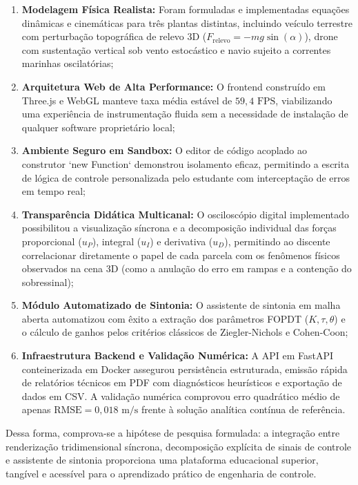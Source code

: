 \begin{enumerate}
    \item \textbf{Modelagem Física Realista:} Foram formuladas e implementadas equações dinâmicas e cinemáticas para três plantas distintas, incluindo veículo terrestre com perturbação topográfica de relevo 3D ($F_{\text{relevo}} = -mg\sin(\alpha)$), drone com sustentação vertical sob vento estocástico e navio sujeito a correntes marinhas oscilatórias;
    \item \textbf{Arquitetura Web de Alta Performance:} O frontend construído em Three.js e WebGL manteve taxa média estável de $59{,}4\text{ FPS}$, viabilizando uma experiência de instrumentação fluida sem a necessidade de instalação de qualquer software proprietário local;
    \item \textbf{Ambiente Seguro em Sandbox:} O editor de código acoplado ao construtor `new Function` demonstrou isolamento eficaz, permitindo a escrita de lógica de controle personalizada pelo estudante com interceptação de erros em tempo real;
    \item \textbf{Transparência Didática Multicanal:} O osciloscópio digital implementado possibilitou a visualização síncrona e a decomposição individual das forças proporcional ($u_P$), integral ($u_I$) e derivativa ($u_D$), permitindo ao discente correlacionar diretamente o papel de cada parcela com os fenômenos físicos observados na cena 3D (como a anulação do erro em rampas e a contenção do sobressinal);
    \item \textbf{Módulo Automatizado de Sintonia:} O assistente de sintonia em malha aberta automatizou com êxito a extração dos parâmetros FOPDT ($K, \tau, \theta$) e o cálculo de ganhos pelos critérios clássicos de Ziegler-Nichols e Cohen-Coon;
    \item \textbf{Infraestrutura Backend e Validação Numérica:} A API em FastAPI conteinerizada em Docker assegurou persistência estruturada, emissão rápida de relatórios técnicos em PDF com diagnósticos heurísticos e exportação de dados em CSV. A validação numérica comprovou erro quadrático médio de apenas $\text{RMSE} = 0{,}018\text{ m/s}$ frente à solução analítica contínua de referência.
\end{enumerate}

Dessa forma, comprova-se a hipótese de pesquisa formulada: a integração entre renderização tridimensional síncrona, decomposição explícita de sinais de controle e assistente de sintonia proporciona uma plataforma educacional superior, tangível e acessível para o aprendizado prático de engenharia de controle.

